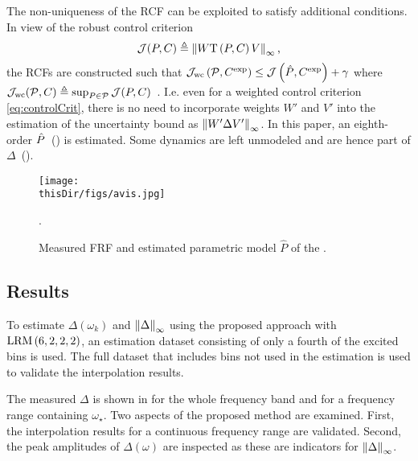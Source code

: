 The non-uniqueness of the \gls{RCF} can be exploited to satisfy additional conditions.
In view of the robust control criterion
\begin{equation}
  \Crit(\Plant,\Controller) 
    \isdef 
      \infnorm{W \ClosedLoop{\Plant,\Controller} V}
  \label{eq:controlCrit}
  \text{,}
\end{equation}
the \glspl{RCF} are constructed such that
$
  \worstCase\Crit \left( \ModelSet[], \experimental\Controller \right)
  \leq
  \Crit \left( \estimated\Plant, \experimental\Controller \right)
  + \gamma
$
where $\worstCase\Crit(\ModelSet[],C) \isdef \sup_{P\in\ModelSet[]} \Crit(P,C)$~\citep{Oomen2012SIRP}.
I.e. even for a weighted control criterion \eqref{eq:controlCrit}, there is no need to incorporate weights $W'$ and $V'$ into the estimation of the uncertainty bound as $\infnorm{W' \Delta V'}$.
In this paper, an eighth-order $\estimated\Plant$~() is estimated.
Some dynamics are left unmodeled and are hence part of $\Delta$~().

\begin{figure}
  \centering
  \setlength{}
  \texttt{[image: \\thisDir/figs/avis.jpg]}
  \caption{.}
  \label{fig:avis}
\end{figure}

\begin{figure}
 \centering
    \setlength{\figurewidth}{0.75\columnwidth}
    \setlength{\figureheight}{0.68\figurewidth}
    
 \caption{Measured \gls{FRF}  and estimated parametric model $\hat{P}$  of the .}
 \label{fig:avis-frf}
\end{figure}

\subsection{Results}
\label{sec:resultsAvis}
To estimate $\Delta(\omega_k)$ and $\hinfnorm{\Delta}$  using the proposed approach with $\lrm{6,2,2,2}$, an estimation dataset consisting of only a fourth of the excited bins is used.
The full dataset that includes bins not used in the estimation is used to validate the interpolation results.

The measured $\Delta$ is shown in  for the whole frequency band and  for a frequency range containing $\omega_{\star}$.
Two aspects of the proposed method are examined.
First, the interpolation results for a continuous frequency range are validated.
Second, the peak amplitudes of $\Delta(\omega)$ are inspected as these are  indicators for $\infnorm{\Delta}$.

